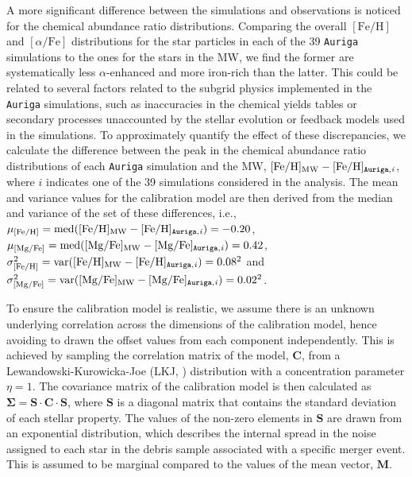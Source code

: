 A more significant difference between the simulations and observations is noticed for the chemical abundance ratio distributions. Comparing the overall $[\mathrm{Fe}/\mathrm{H}]$ and $[\alpha/\mathrm{Fe}]$ distributions for the star particles in each of the 39 \texttt{Auriga} simulations to the ones for the stars in the MW, we find the former are systematically less $\alpha$-enhanced and more iron-rich than the latter. This could be related to several factors related to the subgrid physics implemented in the \texttt{Auriga} simulations, such as inaccuracies in the chemical yields tables or secondary processes unaccounted by the stellar evolution or feedback models used in the simulations. To approximately quantify the effect of these discrepancies, we calculate the difference between the peak in the chemical abundance ratio distributions of each \texttt{Auriga} simulation and the MW, $[\mathrm{Fe}/\mathrm{H}] _{\rm{MW}} -   [\mathrm{Fe}/\mathrm{H}]_{\rm{\texttt{Auriga}},\it{i}}$, where $i$ indicates one of the 39 simulations considered in the analysis. The mean and variance values for the calibration model are then derived from the median and variance of the set of these differences, i.e., $\mu_{[\mathrm{Fe}/\mathrm{H}]}=\rm{med}( [\mathrm{Fe}/\mathrm{H}] _{\rm{MW}} -   [\mathrm{Fe}/\mathrm{H}]_{\rm{\texttt{Auriga}},\it i})  =-0.20$, $\mu_{[\rm{Mg}/\mathrm{Fe}]}=\rm{med}( [\rm{Mg}/\mathrm{Fe}]_{\rm{MW}} -   [\rm{Mg}/\mathrm{Fe}]_{\rm{\texttt{Auriga}}, \it i} )=0.42$, $\sigma^2_{[\mathrm{Fe}/\mathrm{H}]}=\rm{var}( [\mathrm{Fe}/\mathrm{H}] _{\rm{MW}} -   [\mathrm{Fe}/\mathrm{H}]_{\rm{\texttt{Auriga}},\it i})=0.08^2$ and $\sigma^2_{[\rm{Mg}/\mathrm{Fe}]}=\rm{var}( [\rm{Mg}/\mathrm{Fe}]_{\rm{MW}} -   [\rm{Mg}/\mathrm{Fe}]_{\rm{\texttt{Auriga}}, \it i} )=0.02^2$.

To ensure the calibration model is realistic, we assume there is an unknown underlying correlation across the dimensions of the calibration model, hence avoiding to drawn the offset values from each component independently. This is achieved by sampling the correlation matrix of the model, $\mathbf{C}$, from a Lewandowski-Kurowicka-Joe (LKJ, \citeyear{Lewandowski2009}) distribution  with a concentration parameter $\eta=1$. The covariance matrix of the calibration model is then calculated as $\mathbf{\Sigma} = \mathbf{S} \cdot \mathbf{C} \cdot \mathbf{S}$, where $\mathbf{S}$ is a diagonal matrix that contains the standard deviation of each stellar property. The values of the non-zero elements in $\mathbf{S}$ are drawn from an exponential distribution, which describes the internal spread in the noise assigned to each star in the debris sample associated with a specific merger event. This is assumed to be marginal compared to the values of the mean vector, $\mathbf{M}$. 

